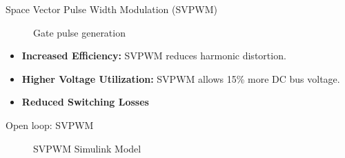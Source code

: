 \begin{frame}{Space Vector Pulse Width Modulation (SVPWM)}

	\begin{figure}
		\centering
		\caption{Gate pulse generation}
	\end{figure}

	\begin{itemize}
		\item \textbf{Increased Efficiency:} SVPWM reduces harmonic distortion.
		\item \textbf{Higher Voltage Utilization:} SVPWM allows 15\% more DC bus voltage.
		\item \textbf{Reduced Switching Losses}
	\end{itemize}

\end{frame}



\begin{frame}{Open loop: SVPWM}
	\begin{figure}
		\centering
		\caption{SVPWM Simulink Model}
	\end{figure}
\end{frame}


